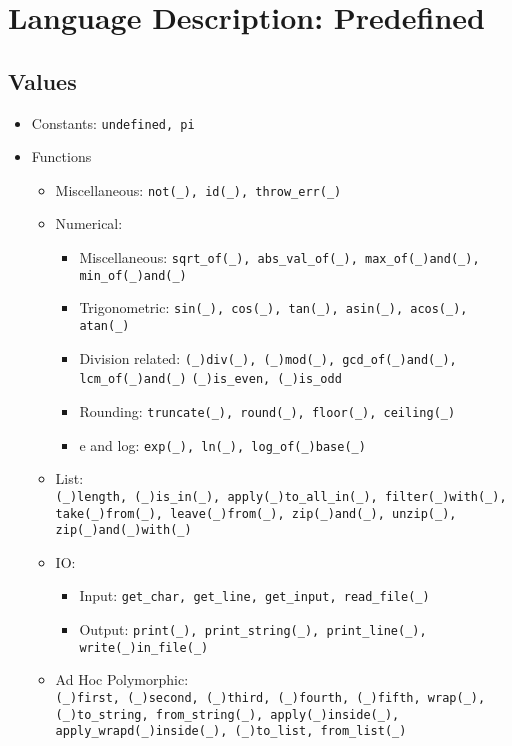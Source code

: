 \documentclass{article}
\begin{document}
\newpage

\section{Language Description: Predefined}

\subsection{Values}

\begin{itemize}

\item Constants: \verb|undefined, pi|

\item Functions
  \begin{itemize}

  \item Miscellaneous: \verb|not(_), id(_), throw_err(_)|

  \item Numerical:
    \begin{itemize}
    \item Miscellaneous:
      \verb|sqrt_of(_), abs_val_of(_), max_of(_)and(_), min_of(_)and(_)|
    \item Trigonometric:
      \verb|sin(_), cos(_), tan(_), asin(_), acos(_), atan(_)|
    \item Division related:
      \verb|(_)div(_), (_)mod(_), gcd_of(_)and(_), lcm_of(_)and(_)|
      \verb|(_)is_even, (_)is_odd|
    \item Rounding:
      \verb|truncate(_), round(_), floor(_), ceiling(_)|
    \item e and log:
      \verb|exp(_), ln(_), log_of(_)base(_)|
    \end{itemize}

  \item List:\\
    \verb|(_)length, (_)is_in(_), apply(_)to_all_in(_), filter(_)with(_), |
    \\
    \verb|take(_)from(_), leave(_)from(_), zip(_)and(_), unzip(_), |
    \verb|zip(_)and(_)with(_)|

  \item IO:
    \begin{itemize}
    \item Input: \verb|get_char, get_line, get_input, read_file(_)|
    \item Output:
      \verb|print(_), print_string(_), print_line(_), write(_)in_file(_)|
    \end{itemize}

  \item Ad Hoc Polymorphic:\\
  \verb|(_)first, (_)second, (_)third, (_)fourth, (_)fifth, wrap(_), |
  \\
  \verb|(_)to_string, from_string(_), apply(_)inside(_), |
  \\
  \verb|apply_wrapd(_)inside(_), (_)to_list, from_list(_)|

  \end{itemize}
\end{itemize}
\end{document}
